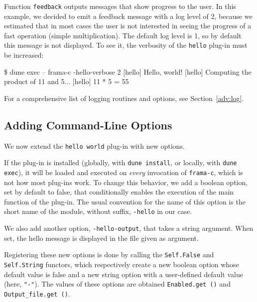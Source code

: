 Function \texttt{feedback} outputs messages that show progress to the
user. In this example, we decided to emit a feedback message with a log level
of 2, because we estimated that in most cases the user is not interested in
seeing the progress of a fast operation (simple multiplication). The default
log level is 1, so by default this message is not displayed. To see
it, the verbosity of the \texttt{hello} plug-in must be increased:

\begin{frama-c-commands}
\$ dune exec -- frama-c -hello-verbose 2
[hello] Hello, world!
[hello] Computing the product of 11 and 5...
[hello] 11 * 5 = 55
\end{frama-c-commands}

For a comprehensive list of logging routines and options, see
Section~\ref{adv:log}.

\subsection{Adding Command-Line Options}\label{tut2:basic-options}

We now extend the \texttt{hello world} plug-in with new options.

If the plug-in is installed (globally, with \verb|dune install|, or locally,
with \verb|dune exec|), it will be loaded and
executed on {\em every} invocation of \texttt{frama-c}, which is not how most
plug-ins work. To change this behavior, we add a boolean option, set by default
to false, that conditionally enables the execution of the main function of the
plug-in. The usual convention for the name of this option is the short
name of the module, without suffix, \ie \texttt{-hello} in our case.

We also add another option, \texttt{-hello-output}, that takes a string
argument. When set, the hello message is displayed in the file given as
argument.


Registering these new options is done by calling the \texttt{Self.False} and
\texttt{Self.String} functors, which respectively create a new boolean option
whose default value is false and a new string option with a user-defined
default value (here, \texttt{"-"}). The values of these options are obtained
\via \texttt{Enabled.get ()} and \texttt{Output\_file.get ()}.

